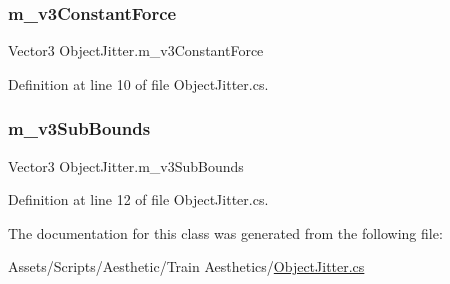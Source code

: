\subsubsection{\texorpdfstring{m\+\_\+v3\+Constant\+Force}{m\_v3ConstantForce}}
{\footnotesize\ttfamily Vector3 Object\+Jitter.\+m\+\_\+v3\+Constant\+Force}



Definition at line 10 of file Object\+Jitter.\+cs.

\mbox{\label{class_object_jitter_acf1ee4109e75ceecca410973841b5aab}} 
\subsubsection{\texorpdfstring{m\+\_\+v3\+Sub\+Bounds}{m\_v3SubBounds}}
{\footnotesize\ttfamily Vector3 Object\+Jitter.\+m\+\_\+v3\+Sub\+Bounds}



Definition at line 12 of file Object\+Jitter.\+cs.



The documentation for this class was generated from the following file\+:\begin{DoxyCompactItemize}
\item 
Assets/\+Scripts/\+Aesthetic/\+Train Aesthetics/\mbox{\hyperlink{_object_jitter_8cs}{Object\+Jitter.\+cs}}\end{DoxyCompactItemize}
